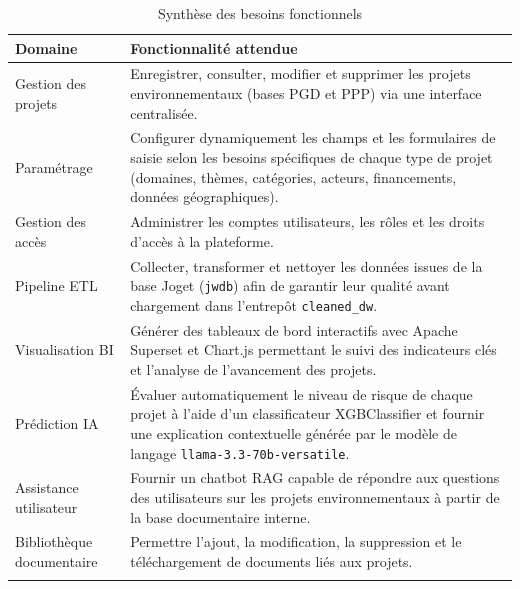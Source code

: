 \begin{longtable}{|m{3.5cm}|m{9.5cm}|}
\hline
\textbf{Domaine} & \textbf{Fonctionnalité attendue} \\
\hline
\endhead

Gestion des projets
& Enregistrer, consulter, modifier et supprimer les projets
environnementaux (bases PGD et PPP) via une interface centralisée. \\
\hline

Paramétrage
& Configurer dynamiquement les champs et les formulaires de saisie
selon les besoins spécifiques de chaque type de projet (domaines,
thèmes, catégories, acteurs, financements, données géographiques). \\
\hline

Gestion des accès
& Administrer les comptes utilisateurs, les rôles et les droits
d'accès à la plateforme. \\
\hline

Pipeline ETL
& Collecter, transformer et nettoyer les données issues de la
base Joget (\texttt{jwdb}) afin de garantir leur qualité avant
chargement dans l'entrepôt \texttt{cleaned\_dw}. \\
\hline

Visualisation BI
& Générer des tableaux de bord interactifs avec Apache Superset
et Chart.js permettant le suivi des indicateurs clés et l'analyse
de l'avancement des projets. \\
\hline

Prédiction IA
& Évaluer automatiquement le niveau de risque de chaque projet
à l'aide d'un classificateur XGBClassifier et fournir une
explication contextuelle générée par le modèle de langage
\texttt{llama-3.3-70b-versatile}. \\
\hline

Assistance utilisateur
& Fournir un chatbot RAG capable de répondre aux questions des
utilisateurs sur les projets environnementaux à partir de la base
documentaire interne. \\
\hline

Bibliothèque documentaire
& Permettre l'ajout, la modification, la suppression et le
téléchargement de documents liés aux projets. \\
\hline

\captionsetup{justification=centering}
\caption{Synthèse des besoins fonctionnels}
\label{tab:besoins_fonctionnels}
\end{longtable}


